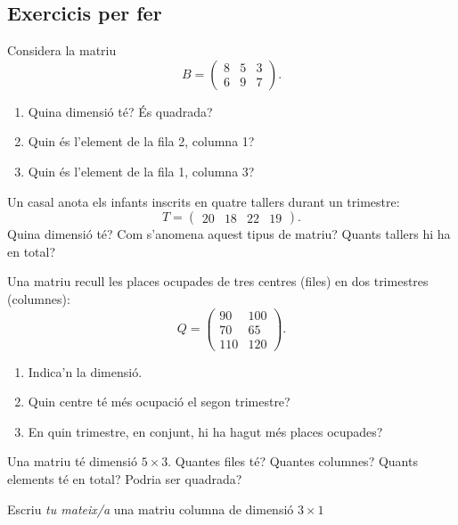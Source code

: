 \subsection{Exercicis per fer}

\begin{exercicis}
\begin{exlist}
  \item Considera la matriu
        \[ B=\begin{pmatrix} 8 & 5 & 3 \\ 6 & 9 & 7 \end{pmatrix}. \]
        \begin{enumerate}[label=\alph*), leftmargin=1.6em, topsep=2pt]
          \item Quina dimensió té? És quadrada?
          \item Quin és l'element de la fila 2, columna 1?
          \item Quin és l'element de la fila 1, columna 3?
        \end{enumerate}
  \item Un casal anota els infants inscrits en quatre tallers durant un trimestre:
        \[ T=\begin{pmatrix} 20 & 18 & 22 & 19 \end{pmatrix}. \]
        Quina dimensió té? Com s'anomena aquest tipus de matriu? Quants tallers hi
        ha en total?
  \item Una matriu recull les places ocupades de tres centres (files) en dos
        trimestres (columnes):
        \[ Q=\begin{pmatrix} 90 & 100 \\ 70 & 65 \\ 110 & 120 \end{pmatrix}. \]
        \begin{enumerate}[label=\alph*), leftmargin=1.6em, topsep=2pt]
          \item Indica'n la dimensió.
          \item Quin centre té més ocupació el segon trimestre?
          \item En quin trimestre, en conjunt, hi ha hagut més places ocupades?
        \end{enumerate}
  \item Una matriu té dimensió $5\times 3$. Quantes files té? Quantes columnes?
        Quants elements té en total? Podria ser quadrada?
  \item Escriu \emph{tu mateix\slash a} una matriu columna de dimensió $3\times 1$

\end{exlist}
\end{exercicis}
